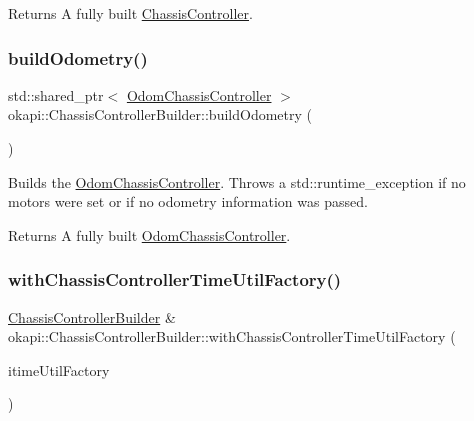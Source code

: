 \begin{DoxyReturn}{Returns}
A fully built \mbox{\hyperlink{classokapi_1_1ChassisController}{Chassis\+Controller}}. 
\end{DoxyReturn}
\mbox{\label{classokapi_1_1ChassisControllerBuilder_a9c631ea817466483aa2cfcb886f6d892}} 
\subsubsection{\texorpdfstring{buildOdometry()}{buildOdometry()}}
{\footnotesize\ttfamily std\+::shared\+\_\+ptr$<$ \mbox{\hyperlink{classokapi_1_1OdomChassisController}{Odom\+Chassis\+Controller}} $>$ okapi\+::\+Chassis\+Controller\+Builder\+::build\+Odometry (\begin{DoxyParamCaption}{ }\end{DoxyParamCaption})}

Builds the \mbox{\hyperlink{classokapi_1_1OdomChassisController}{Odom\+Chassis\+Controller}}. Throws a std\+::runtime\+\_\+exception if no motors were set or if no odometry information was passed.

\begin{DoxyReturn}{Returns}
A fully built \mbox{\hyperlink{classokapi_1_1OdomChassisController}{Odom\+Chassis\+Controller}}. 
\end{DoxyReturn}
\mbox{\label{classokapi_1_1ChassisControllerBuilder_a1ca2919cbd6fa19b34aeaa1eeee98462}} 
\subsubsection{\texorpdfstring{withChassisControllerTimeUtilFactory()}{withChassisControllerTimeUtilFactory()}}
{\footnotesize\ttfamily \mbox{\hyperlink{classokapi_1_1ChassisControllerBuilder}{Chassis\+Controller\+Builder}} \& okapi\+::\+Chassis\+Controller\+Builder\+::with\+Chassis\+Controller\+Time\+Util\+Factory (\begin{DoxyParamCaption}\item[{const \mbox{\hyperlink{classokapi_1_1TimeUtilFactory}{Time\+Util\+Factory}} \&}]{itime\+Util\+Factory }\end{DoxyParamCaption})}


